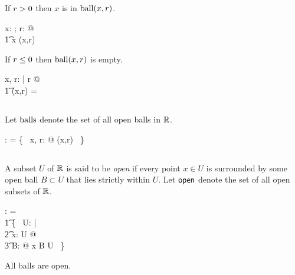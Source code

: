 \documentclass{amsart}
\begin{document}
\begin{remark}
If $r \mathrel{>} 0$ then $x$ is in $\operatorname{ball}(x, r)$. 

\begin{zed}
	\forall x: \R; r: \Rpos @ \\
	\t1	x \in \ballR(x,r)
\end{zed}

\end{remark}

\begin{remark}
If $r \mathrel{\leq} 0$ then $\operatorname{ball}(x,r)$ is empty.

\begin{zed}
	\forall x, r: \R | r \leR \zeroR @ \\
	\t1	\ballR(x,r) = \emptyset
\end{zed}

\end{remark}

\subsection{}

Let $\operatorname{balls}$ denote the set of all open balls in $\mathbb{R}$.

\begin{axdef}
	\ballsR: \Fam \R
\where
	\ballsR = \{~ x, r: \R @ \ballR(x,r) ~\}
\end{axdef}

\subsection{}

A subset $U$ of $\mathbb{R}$ is said to be {\it open} if every point $x \in U$ is surrounded by some open ball $B \subset U$ that lies
strictly within $U$.
Let $\mathsf{open}$ denote the set of all open subsets of $\mathbb{R}$.

\begin{axdef}
	\openR: \Fam \R
\where
	\openR = \\
	\t1	\{~ U:  \power \R | \\
	\t2		\forall x: U @ \\
	\t3			\exists B: \ballsR @ x \in B \subset U ~\}
\end{axdef}

\begin{remark}
All balls are open.

\begin{zed}
	\ballsR \subset \openR
\end{zed}

\end{remark}
\end{document}
